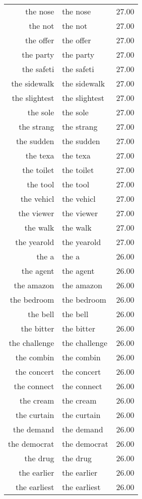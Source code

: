 \begin{table}[ht]
\begin{tabular}{rlr}
  the nose & the nose & 27.00 \\ 
  the not & the not & 27.00 \\ 
  the offer & the offer & 27.00 \\ 
  the party & the party & 27.00 \\ 
  the safeti & the safeti & 27.00 \\ 
  the sidewalk & the sidewalk & 27.00 \\ 
  the slightest & the slightest & 27.00 \\ 
  the sole & the sole & 27.00 \\ 
  the strang & the strang & 27.00 \\ 
  the sudden & the sudden & 27.00 \\ 
  the texa & the texa & 27.00 \\ 
  the toilet & the toilet & 27.00 \\ 
  the tool & the tool & 27.00 \\ 
  the vehicl & the vehicl & 27.00 \\ 
  the viewer & the viewer & 27.00 \\ 
  the walk & the walk & 27.00 \\ 
  the yearold & the yearold & 27.00 \\ 
  the a & the a & 26.00 \\ 
  the agent & the agent & 26.00 \\ 
  the amazon & the amazon & 26.00 \\ 
  the bedroom & the bedroom & 26.00 \\ 
  the bell & the bell & 26.00 \\ 
  the bitter & the bitter & 26.00 \\ 
  the challenge & the challenge & 26.00 \\ 
  the combin & the combin & 26.00 \\ 
  the concert & the concert & 26.00 \\ 
  the connect & the connect & 26.00 \\ 
  the cream & the cream & 26.00 \\ 
  the curtain & the curtain & 26.00 \\ 
  the demand & the demand & 26.00 \\ 
  the democrat & the democrat & 26.00 \\ 
  the drug & the drug & 26.00 \\ 
  the earlier & the earlier & 26.00 \\ 
  the earliest & the earliest & 26.00 \\ 

\end{tabular}
\end{table}
